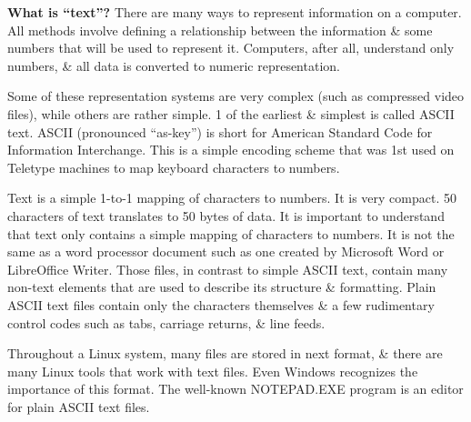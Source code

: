 \documentclass[oneside]{book}
\numberwithin{equation}{section}
\begin{document}
\textbf{What is ``text''?} There are many ways to represent information on a computer. All methods involve defining a relationship between the information \& some numbers that will be used to represent it. Computers, after all, understand only numbers, \& all data is converted to numeric representation.

Some of these representation systems are very complex (such as compressed video files), while others are rather simple. 1 of the earliest \& simplest is called ASCII text. ASCII (pronounced ``as-key'') is short for American Standard Code for Information Interchange. This is a simple encoding scheme that was 1st used on Teletype machines to map keyboard characters to numbers.

Text is a simple 1-to-1 mapping of characters to numbers. It is very compact. 50 characters of text translates to 50 bytes of data. It is important to understand that text only contains a simple mapping of characters to numbers. It is not the same as a word processor document such as one created by Microsoft Word or LibreOffice Writer. Those files, in contrast to simple ASCII text, contain many non-text elements that are used to describe its structure \& formatting. Plain ASCII text files contain only the characters themselves \& a few rudimentary control codes such as tabs, carriage returns, \& line feeds.

Throughout a Linux system, many files are stored in next format, \& there are many Linux tools that work with text files. Even Windows recognizes the importance of this format. The well-known NOTEPAD.EXE program is an editor for plain ASCII text files.
\end{document}
